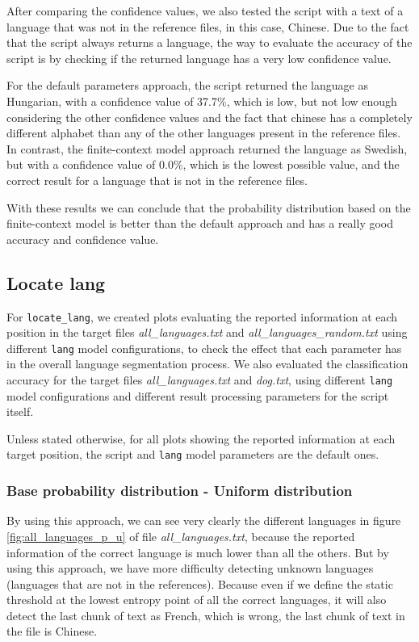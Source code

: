 \documentclass{article}
\begin{document}
After comparing the confidence values, we also tested the script with a text of a language that was not in the reference files, in this case, Chinese.
Due to the fact that the script always returns a language, the way to evaluate the accuracy of the script is by checking if the returned language has a very low confidence value.

For the default parameters approach, the script returned the language as Hungarian, with a confidence value of 37.7\%, which is low, but not low enough considering the other confidence values and
the fact that chinese has a completely different alphabet than any of the other languages present in the reference files.
In contrast, the finite-context model approach returned the language as Swedish, but with a confidence value of 0.0\%, which is the lowest possible value, and the correct result
for a language that is not in the reference files.

With these results we can conclude that the probability distribution based on the finite-context model is better than the default approach and has a really good accuracy and confidence value.

\subsection{Locate lang}
\label{subsec:results_locate_lang}

For \texttt{locate_lang}, we created plots evaluating the reported information at each position in the target files \textit{all\_languages.txt} and \textit{all\_languages\_random.txt} using different \texttt{lang} model configurations, to check the effect that each parameter has in the overall language segmentation process.
We also evaluated the classification accuracy for the target files \textit{all\_languages.txt} and \textit{dog.txt}, using different \texttt{lang} model configurations and different result processing parameters for the script itself.

Unless stated otherwise, for all plots showing the reported information at each target position, the script and \texttt{lang} model parameters are the default ones.

\subsubsection{Base probability distribution - Uniform distribution}
\label{subsubsec:results_locate_lang_uniform_distribution}

By using this approach, we can see very clearly the different languages in figure \ref{fig:all_languages_p_u} of file \textit{all\_languages.txt},
because the reported information of the correct language is much lower than all the others.
But by using this approach, we have more difficulty detecting unknown languages (languages that are not in the references).
Because even if we define the static threshold at the lowest entropy point of all the correct languages,
it will also detect the last chunk of text as French, which is wrong, the last chunk of text in the file is Chinese. %
\end{document}
